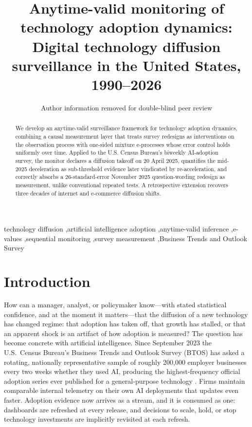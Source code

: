 \documentclass[review,authoryear,12pt]{elsarticle}
\begin{document}
\linenumbers

\begin{frontmatter}

\title{Anytime-valid monitoring of technology adoption dynamics: Digital technology diffusion surveillance in the United States, 1990--2026}

\author{Author information removed for double-blind peer review}

\begin{abstract}
We develop an anytime-valid surveillance framework for technology adoption dynamics, combining a causal measurement layer that treats survey redesigns as interventions on the observation process with one-sided mixture e-processes whose error control holds uniformly over time. Applied to the U.S. Census Bureau's biweekly AI-adoption survey, the monitor declares a diffusion takeoff on 20 April 2025, quantifies the mid-2025 deceleration as sub-threshold evidence later vindicated by re-acceleration, and correctly absorbs a 26-standard-error November 2025 question-wording redesign as measurement, unlike conventional repeated tests. A retrospective extension recovers three decades of internet and e-commerce diffusion shifts.
\end{abstract}

\begin{keyword}
technology diffusion \sep artificial intelligence adoption \sep anytime-valid inference \sep e-values \sep sequential monitoring \sep survey measurement \sep Business Trends and Outlook Survey
\end{keyword}

\end{frontmatter}

\section{Introduction}
\label{sec:intro}

How can a manager, analyst, or policymaker know---with stated statistical confidence, and at the moment it matters---that the diffusion of a new technology has changed regime: that adoption has taken off, that growth has stalled, or that an apparent shock is an artifact of how adoption is measured? The question has become concrete with artificial intelligence. Since September 2023 the U.S.\ Census Bureau's Business Trends and Outlook Survey (BTOS) has asked a rotating, nationally representative sample of roughly 200,000 employer businesses every two weeks whether they used AI, producing the highest-frequency official adoption series ever published for a general-purpose technology \citep{bonney2024}. Firms maintain comparable internal telemetry on their own AI deployments that updates even faster. Adoption evidence now arrives as a stream, and it is consumed as one: dashboards are refreshed at every release, and decisions to scale, hold, or stop technology investments are implicitly revisited at each refresh.
\end{document}
